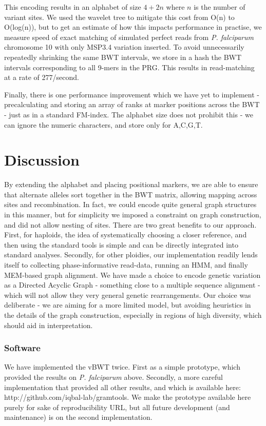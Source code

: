 \documentclass[runningheads,a4paper]{llncs}
\begin{document}
This encoding results in an alphabet of size $4+2n$ where $n$ is the number of variant sites. We used the wavelet tree to mitigate this cost from O(n) to O(log(n)), but to get an estimate of how this impacts performance in practise, we measure speed of exact matching of simulated perfect reads from \textit{P. falciparum} chromosome 10 with only MSP3.4 variation inserted. To avoid unnecessarily repeatedly shrinking the same BWT intervals, we store  in a hash the  BWT intervals corresponding to all 9-mers in the PRG. This results in read-matching at a rate of 277/second.



Finally, there is one performance improvement which we have yet to implement - precalculating and storing an array of ranks at marker positions across the BWT - just as in a standard FM-index. The alphabet size does not prohibit this - we can ignore the numeric characters, and store only for A,C,G,T. 

\section{Discussion}
By extending the alphabet and placing positional markers, we are able to ensure that alternate alleles sort together in the BWT matrix, allowing mapping across sites and recombination. In fact, we could encode quite general graph structures in this manner, but for simplicity we imposed a constraint on graph construction, and did not allow nesting of sites. There are two great benefits to our approach. First, for haploids, the idea of systematically choosing a closer reference, and then using the standard tools is simple and can be directly integrated into standard analyses. Secondly, for other ploidies, our implementation readily lends itself to collecting phase-informative read-data, running an HMM, and finally MEM-based graph alignment. We have made a choice to encode genetic variation as a Directed Acyclic Graph - something close to a multiple sequence alignment - which will not allow they very general genetic rearrangements. Our choice was deliberate - we are aiming for a more limited model, but avoiding heuristics in the details of the graph construction, especially in regions of high diversity, which should aid in interpretation. 






\subsubsection{Software}
We have implemented the vBWT twice. First as a simple prototype, which provided the results on \textit{P. falciparum} above. Secondly,  a more careful implementation that provided all other results, and which is available here: http://github.com/iqbal-lab/gramtools. We make the prototype available here purely for sake of reproducibility URL, but all future development (and maintenance) is on the second implementation.
\end{document}
